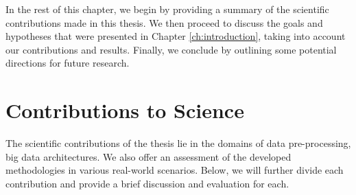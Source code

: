 In the rest of this chapter, we begin by providing a summary of the scientific contributions made in this thesis. 
We then proceed to discuss the goals and hypotheses that were presented in Chapter \ref{ch:introduction}, taking into account our contributions and results. 
Finally, we conclude by outlining some potential directions for future research.

\section{Contributions to Science}
\label{sec:contributions_to_science}


\noindent The scientific contributions of the thesis lie in the domains of data pre-processing, big data architectures. 
We also offer an assessment of the developed methodologies in various real-world scenarios.
Below, we will further divide each contribution and provide a brief discussion and evaluation for each.\\

